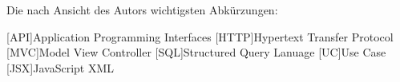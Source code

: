 \chapter*{\nameoflistofacronyms}

Die nach Ansicht des Autors wichtigsten Abkürzungen:
\bigskip

\begin{adjustwidth}{1.5em}{}
\begin{acronym}[AAAAA] %
	
	
	
	[API]{Application Programming Interfaces}
	[HTTP]{Hypertext Transfer Protocol}
	[MVC]{Model View Controller}
	[SQL]{Structured Query Lanuage}
	[UC]{Use Case}
	[JSX]{JavaScript XML}

	
	
	
\end{acronym}	
\end{adjustwidth}
